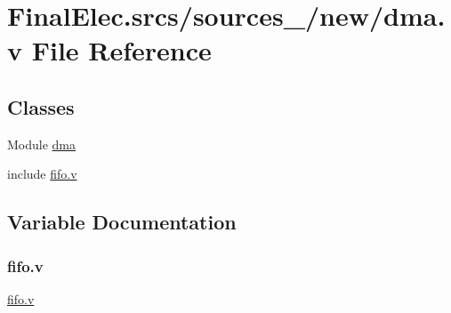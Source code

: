 \hypertarget{dma_8v}{}\section{Final\+Elec.\+srcs/sources\+\_/new/dma.v File Reference}
\label{dma_8v}
\subsection*{Classes}
\begin{DoxyCompactItemize}
\item 
Module \mbox{\hyperlink{enumdma}{dma}}
\end{DoxyCompactItemize}
\begin{DoxyCompactItemize}
\item 
include \mbox{\hyperlink{dma_8v_a1e5c1a4f3cd875bdef06967cc860334a}{fifo.\+v}}
\end{DoxyCompactItemize}


\subsection{Variable Documentation}
\mbox{\label{dma_8v_a1e5c1a4f3cd875bdef06967cc860334a}} 
\subsubsection{\texorpdfstring{fifo.\+v}{fifo.v}}
{\footnotesize\ttfamily \mbox{\hyperlink{dma_8v_a1e5c1a4f3cd875bdef06967cc860334a}{fifo.\+v}} \hspace{0.3cm}{\ttfamily [Include]}}

